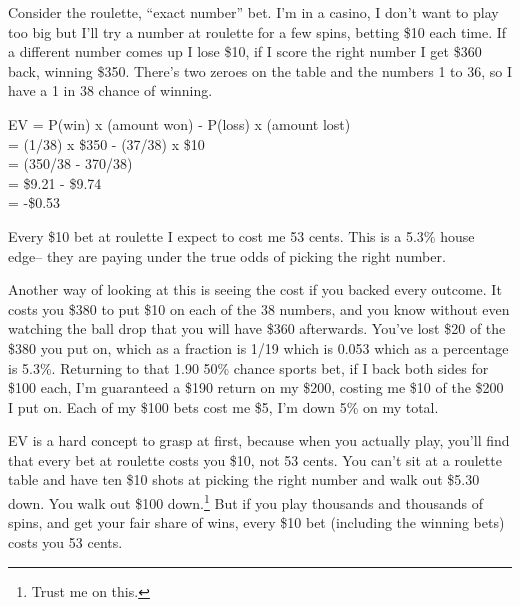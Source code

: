 Consider the roulette, ``exact number'' bet. I'm in a casino,
I don't want to play too big but I'll try a number at roulette for a few
spins, betting \$10 each time. If a different number comes up I lose \$10,
if I score the right number I get \$360 back, winning \$350. There's two
zeroes on the table and the numbers 1 to 36, so I have a 1 in 38 chance of
winning.

EV = P(win) x (amount won) - P(loss) x (amount lost) \\
   = (1/38) x \$350 - (37/38) x \$10 \\
   = (350/38 - 370/38)  \\
   = \$9.21 - \$9.74 \\
   = -\$0.53

Every \$10 bet at roulette I expect to cost me 53 cents. This is a 5.3\% house
edge-- they are paying under the true odds of picking the right
number.

Another way of looking at this is seeing the cost if you backed every
outcome. It costs you \$380 to put \$10 on each of the 38 numbers, and
you know without even watching the ball drop that you will have \$360
afterwards. You've lost \$20 of the \$380 you put on, which as a
fraction is 1/19 which is 0.053 which as a percentage is 5.3\%.
Returning to that 1.90 50\% chance sports bet, if I back both sides for
\$100 each, I'm guaranteed a \$190 return on my \$200, costing me \$10
of the \$200 I put on. Each of my \$100 bets cost me \$5, I'm down 5\%
on my total.


EV is a hard concept to grasp at first, because when you actually
play, you'll find that every bet at roulette costs you \$10, not
53 cents. You can't sit at a roulette table and
have ten \$10 shots at picking the right number and walk out \$5.30
down. You walk out \$100 down.\footnote{Trust me on this.} But if you
play thousands and thousands of spins, and get your fair share of
wins, every \$10 bet (including the winning bets) costs you 53
cents.


